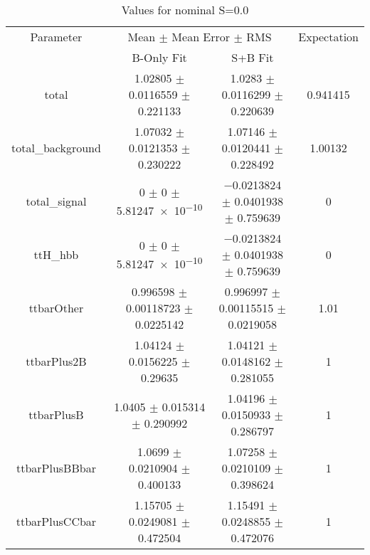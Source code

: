 \begin{table}
\centering
\caption{Values for nominal S=0.0}
\begin{tabular}{cccc}
\toprule
Parameter & \multicolumn{2}{c}{Mean $\pm$ Mean Error $\pm$ RMS} & Expectation\\
 & B-Only Fit & S+B Fit & \\
\midrule
total & \num{1.02805} $\pm$ \num{0.0116559} $\pm$ \num{0.221133} & \num{1.0283} $\pm$ \num{0.0116299} $\pm$ \num{0.220639} & \num{0.941415}\\
total\_background & \num{1.07032} $\pm$ \num{0.0121353} $\pm$ \num{0.230222} & \num{1.07146} $\pm$ \num{0.0120441} $\pm$ \num{0.228492} & \num{1.00132}\\
total\_signal & \num{0} $\pm$ \num{0} $\pm$ \num{5.81247e-10} & \num{-0.0213824} $\pm$ \num{0.0401938} $\pm$ \num{0.759639} & \num{0}\\
ttH\_hbb & \num{0} $\pm$ \num{0} $\pm$ \num{5.81247e-10} & \num{-0.0213824} $\pm$ \num{0.0401938} $\pm$ \num{0.759639} & \num{0}\\
ttbarOther & \num{0.996598} $\pm$ \num{0.00118723} $\pm$ \num{0.0225142} & \num{0.996997} $\pm$ \num{0.00115515} $\pm$ \num{0.0219058} & \num{1.01}\\
ttbarPlus2B & \num{1.04124} $\pm$ \num{0.0156225} $\pm$ \num{0.29635} & \num{1.04121} $\pm$ \num{0.0148162} $\pm$ \num{0.281055} & \num{1}\\
ttbarPlusB & \num{1.0405} $\pm$ \num{0.015314} $\pm$ \num{0.290992} & \num{1.04196} $\pm$ \num{0.0150933} $\pm$ \num{0.286797} & \num{1}\\
ttbarPlusBBbar & \num{1.0699} $\pm$ \num{0.0210904} $\pm$ \num{0.400133} & \num{1.07258} $\pm$ \num{0.0210109} $\pm$ \num{0.398624} & \num{1}\\
ttbarPlusCCbar & \num{1.15705} $\pm$ \num{0.0249081} $\pm$ \num{0.472504} & \num{1.15491} $\pm$ \num{0.0248855} $\pm$ \num{0.472076} & \num{1}\\
\bottomrule
\end{tabular}
\end{table}